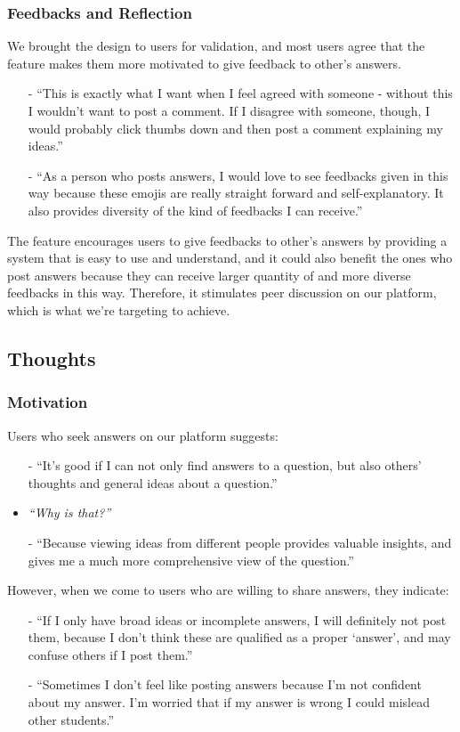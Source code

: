 \documentclass[a4paper]{article}
\begin{document}
    \subsubsection*{Feedbacks and Reflection}
    \noindent We brought the design to users for validation, and most users agree that the feature makes them more motivated to give feedback to other's answers.
    \begin{itemize}
        \item[-] ``This is exactly what I want when I feel agreed with someone - without this I wouldn't want to post a comment.
        If I disagree with someone, though, I would probably click thumbs down and then post a comment explaining my ideas.''
        \item[-] ``As a person who posts answers, I would love to see feedbacks given in this way because these emojis are really straight forward and self-explanatory.
        It also provides diversity of the kind of feedbacks I can receive.''
    \end{itemize}

    The feature encourages users to give feedbacks to other's answers by providing a system that is easy to use and understand,
    and it could also benefit the ones who post answers because they can receive larger quantity of and more diverse feedbacks in this way.
    Therefore, it stimulates peer discussion on our platform, which is what we're targeting to achieve.

    \subsection*{Thoughts}

    \subsubsection*{Motivation}
    \noindent Users who seek answers on our platform suggests:
    \begin{itemize}
        \item[-] ``It's good if I can not only find answers to a question, but also others' thoughts and general ideas about a question.''
        \item \textit{``Why is that?''}
        \item[-] ``Because viewing ideas from different people provides valuable insights, and gives me a much more comprehensive view of the question.''
    \end{itemize}
    \noindent However, when we come to users who are willing to share answers, they indicate:
    \begin{itemize}
        \item[-] ``If I only have broad ideas or incomplete answers, I will definitely not post them,
        because I don't think these are qualified as a proper `answer', and may confuse others if I post them.''
        \item[-] ``Sometimes I don't feel like posting answers because I'm not confident about my answer.
        I'm worried that if my answer is wrong I could mislead other students.''
    \end{itemize}
\end{document}
